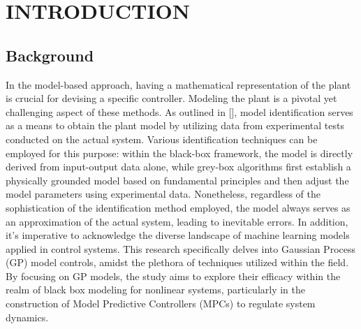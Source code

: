 \section{INTRODUCTION}\label{a:latex_en}

\subsection{Background}
In the model-based approach, having a mathematical representation of the plant is crucial for devising a specific controller. Modeling the plant is a pivotal yet challenging aspect of these methods. As outlined in [\cite{panizza2015}], model identification serves as a means to obtain the plant model by utilizing data from experimental tests conducted on the actual system. Various identification techniques can be employed for this purpose: within the black-box framework, the model is directly derived from input-output data alone, while grey-box algorithms first establish a physically grounded model based on fundamental principles and then adjust the model parameters using experimental data. Nonetheless, regardless of the sophistication of the identification method employed, the model always serves as an approximation of the actual system, leading to inevitable errors. In addition, it's imperative to acknowledge the diverse landscape of machine learning models applied in control systems\cite{DEV20213744}. This research specifically delves into Gaussian Process (GP) model controls, amidst the plethora of techniques utilized within the field. By focusing on GP models, the study aims to explore their efficacy within the realm of black box modeling for nonlinear systems, particularly in the construction of Model Predictive Controllers (MPCs) to regulate system dynamics.


